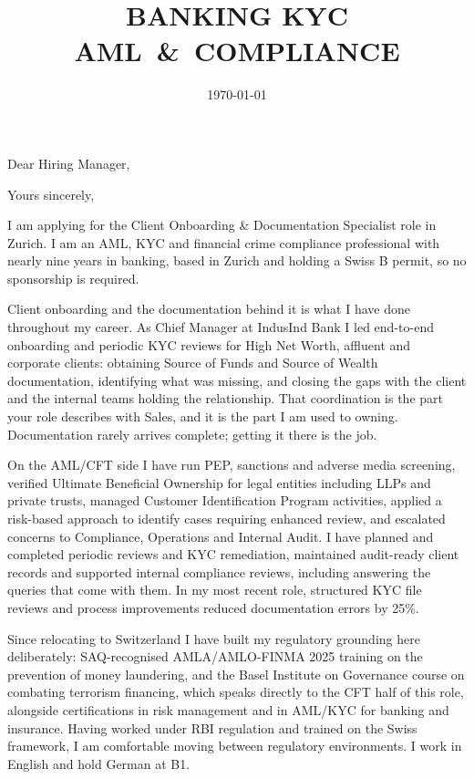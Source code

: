 \documentclass[11pt,a4paper,sans]{moderncv}
\title{BANKING \textbar{} KYC \textbar{} \mbox{AML \& COMPLIANCE}}
\begin{document}
\date{\today}
\opening{Dear Hiring Manager,}
\closing{Yours sincerely,}

\makelettertitle

I am applying for the Client Onboarding \& Documentation Specialist role in
Zurich. I am an AML, KYC and financial crime compliance professional with
nearly nine years in banking, based in Zurich and holding a Swiss B permit, so
no sponsorship is required.

Client onboarding and the documentation behind it is what I have done
throughout my career. As Chief Manager at IndusInd Bank I led end-to-end
onboarding and periodic KYC reviews for High Net Worth, affluent and corporate
clients: obtaining Source of Funds and Source of Wealth documentation,
identifying what was missing, and closing the gaps with the client and the
internal teams holding the relationship. That coordination is the part your
role describes with Sales, and it is the part I am used to owning. Documentation
rarely arrives complete; getting it there is the job.

On the AML/CFT side I have run PEP, sanctions and adverse media screening,
verified Ultimate Beneficial Ownership for legal entities including LLPs and
private trusts, managed Customer Identification Program activities, applied a
risk-based approach to identify cases requiring enhanced review, and escalated
concerns to Compliance, Operations and Internal Audit. I have planned and
completed periodic reviews and KYC remediation, maintained audit-ready client
records and supported internal compliance reviews, including answering the
queries that come with them. In my most recent role, structured KYC file
reviews and process improvements reduced documentation errors by 25\%.

Since relocating to Switzerland I have built my regulatory grounding here
deliberately: SAQ-recognised AMLA/AMLO-FINMA 2025 training on the prevention of
money laundering, and the Basel Institute on Governance course on combating
terrorism financing, which speaks directly to the CFT half of this role,
alongside certifications in risk management and in AML/KYC for banking and
insurance. Having worked under RBI regulation and trained on the Swiss
framework, I am comfortable moving between regulatory environments. I work in
English and hold German at B1.
\end{document}
